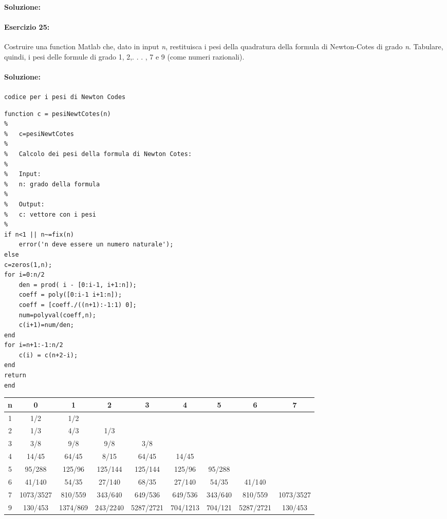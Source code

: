 \documentclass[12pt]{article}
\begin{document}
\paragraph{Soluzione:}


\paragraph{Esercizio 25:}
Costruire una function Matlab che, dato in input \emph{n}, restituisca i pesi della quadratura della formula di Newton-Cotes di grado \emph{n}. Tabulare, quindi, i pesi delle formule di grado
1, 2,. . . , 7 e 9 (come numeri razionali).


\paragraph{Soluzione:}

\texttt{codice per i pesi di Newton Codes}
\begin{lstlisting}[frame=single]
function c = pesiNewtCotes(n)
%
%   c=pesiNewtCotes
%
%   Calcolo dei pesi della formula di Newton Cotes:
%
%   Input:
%   n: grado della formula
%
%   Output:
%   c: vettore con i pesi
%
if n<1 || n~=fix(n)
    error('n deve essere un numero naturale');
else
c=zeros(1,n);
for i=0:n/2
    den = prod( i - [0:i-1, i+1:n]);
    coeff = poly([0:i-1 i+1:n]);
    coeff = [coeff./((n+1):-1:1) 0];
    num=polyval(coeff,n);
    c(i+1)=num/den;
end
for i=n+1:-1:n/2
    c(i) = c(n+2-i);
end
return
end
\end{lstlisting}


\begin{center}
\begin{adjustbox}{width=\textwidth}
\begin{tabular}{||c || c | c | c | c | c | c | c | c ||} 
     \hline
     
     n & 0 & 1 & 2 & 3 & 4 & 5 & 6 & 7\\
     \hline\hline
     1 & 1/2 & 1/2 & & & & & & \\ 
     \hline
     2 & 1/3 & 4/3 & 1/3 & & & & & \\
     \hline
     3 & 3/8 & 9/8 & 9/8 & 3/8 & & & & \\
     \hline
     4 & 14/45 & 64/45 & 8/15 & 64/45 & 14/45 & & & \\
     \hline
     5 & 95/288 & 125/96 & 125/144 & 125/144 & 125/96 & 95/288 & & \\ 
     \hline
     6 & 41/140 & 54/35 & 27/140 & 68/35 & 27/140 & 54/35 & 41/140 & \\  
     \hline
     7 & 1073/3527 & 810/559 & 343/640 & 649/536 & 649/536 & 343/640 & 810/559 & 1073/3527\\  
     \hline
     9 & 130/453 & 1374/869 & 243/2240 & 5287/2721 & 704/1213 & 704/121 & 5287/2721 & 130/453\\
     \hline
\end{tabular}
\end{adjustbox}
\end{center}
\end{document}
